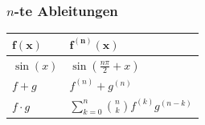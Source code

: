 \documentclass[a4paper,10pt]{article}
\begin{document}
\subsubsection{$n$-te Ableitungen}
\begin{center}
  \begin{tabularx}{\linewidth}{>{\centering\arraybackslash}X>{\centering\arraybackslash}X}
  \toprule
  $\mathbf{f(x)}$ & $\mathbf{f^{(n)}(x)}$ \\
  \midrule
  $\sin(x)$ & $\sin(\frac{n\pi}{2} + x)$\\
  $f + g$ & $f^{(n)} + g^{(n)}$\\
  $f \cdot g$ & $\sum\limits_{k=0}^{n}\binom{n}{k}f^{(k)}g^{(n-k)}$\\
  \bottomrule
  \end{tabularx}
\end{center}
\end{document}
